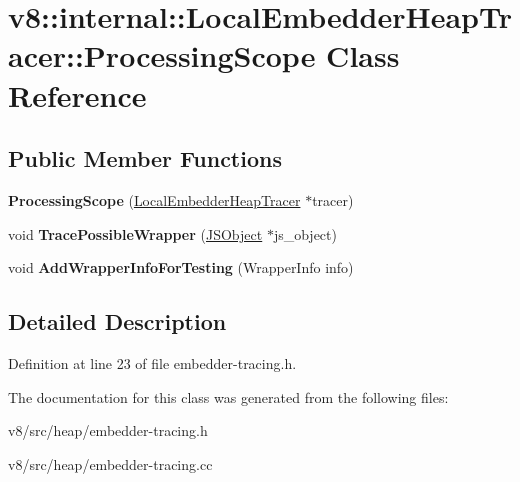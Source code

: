 \hypertarget{classv8_1_1internal_1_1LocalEmbedderHeapTracer_1_1ProcessingScope}{}\section{v8\+:\+:internal\+:\+:Local\+Embedder\+Heap\+Tracer\+:\+:Processing\+Scope Class Reference}
\label{classv8_1_1internal_1_1LocalEmbedderHeapTracer_1_1ProcessingScope}
\subsection*{Public Member Functions}
\begin{DoxyCompactItemize}
\item 
\mbox{\label{classv8_1_1internal_1_1LocalEmbedderHeapTracer_1_1ProcessingScope_adb06f96be9232fc1e865edb69734b8e3}} 
{\bfseries Processing\+Scope} (\mbox{\hyperlink{classv8_1_1internal_1_1LocalEmbedderHeapTracer}{Local\+Embedder\+Heap\+Tracer}} $\ast$tracer)
\item 
\mbox{\label{classv8_1_1internal_1_1LocalEmbedderHeapTracer_1_1ProcessingScope_a9dd0edec449aee98393887df735b083a}} 
void {\bfseries Trace\+Possible\+Wrapper} (\mbox{\hyperlink{classv8_1_1internal_1_1JSObject}{J\+S\+Object}} $\ast$js\+\_\+object)
\item 
\mbox{\label{classv8_1_1internal_1_1LocalEmbedderHeapTracer_1_1ProcessingScope_afa856791a2cb9b5b4d2f0fed00f801a6}} 
void {\bfseries Add\+Wrapper\+Info\+For\+Testing} (Wrapper\+Info info)
\end{DoxyCompactItemize}


\subsection{Detailed Description}


Definition at line 23 of file embedder-\/tracing.\+h.



The documentation for this class was generated from the following files\+:\begin{DoxyCompactItemize}
\item 
v8/src/heap/embedder-\/tracing.\+h\item 
v8/src/heap/embedder-\/tracing.\+cc\end{DoxyCompactItemize}
